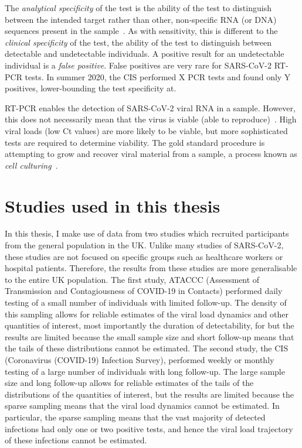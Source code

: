 \documentclass[thesis.tex]{subfiles}
\begin{document}
The \emph{analytical specificity} of the test is the ability of the test to distinguish between the intended target rather than other, non-specific RNA (or DNA) sequences present in the sample~\autocite{bustinMIQE}.
As with sensitivity, this is different to the \emph{clinical specificity} of the test, the ability of the test to distinguish between detectable and undetectable individuals.
A positive result for an undetectable individual is a \emph{false positive}.
False positives are very rare for SARS-CoV-2 RT-PCR tests.
In summer 2020, the CIS performed X PCR tests and found only Y positives, lower-bounding the test specificity at.

RT-PCR enables the detection of SARS-CoV-2 viral RNA in a sample.
However, this does not necessarily mean that the virus is viable (\ie able to reproduce)~\autocite{puhachSARSCoV2}.
High viral loads (low Ct values) are more likely to be viable, but more sophisticated tests are required to determine viability.
The gold standard procedure is attempting to grow and recover viral material from a sample, a process known as \emph{cell culturing}~\autocite{singanayagamDuration,puhachSARSCoV2,hakkiOnset}.


\section{Studies used in this thesis} \label{biology-data:sec:studies}

In this thesis, I make use of data from two studies which recruited participants from the general population in the UK.
Unlike many studies of SARS-CoV-2, these studies are not focused on specific groups such as healthcare workers or hospital patients.
Therefore, the results from these studies are more generalisable to the entire UK population.
The first study, ATACCC (Assessment of Transmission and Contagiousness of COVID-19 in Contacts) performed daily testing of a small number of individuals with limited follow-up.
The density of this sampling allows for reliable estimates of the viral load dynamics and other quantities of interest, most importantly the duration of detectability, for but the results are limited because the small sample size and short follow-up means that the tails of these distributions cannot be estimated.
The second study, the CIS (Coronavirus (COVID-19) Infection Survey), performed weekly or monthly testing of a large number of individuals with long follow-up.
The large sample size and long follow-up allows for reliable estimates of the tails of the distributions of the quantities of interest, but the results are limited because the sparse sampling means that the viral load dynamics cannot be estimated.
In particular, the sparse sampling means that the vast majority of detected infections had only one or two positive tests, and hence the viral load trajectory of these infections cannot be estimated.
\end{document}
